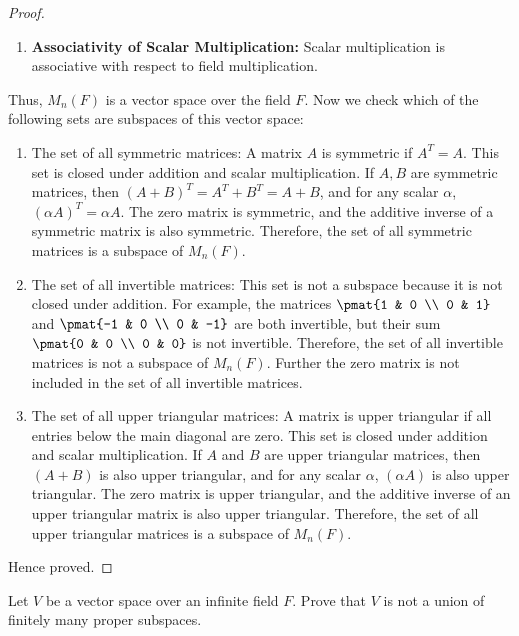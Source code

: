 \documentclass[openany]{book}
\begin{document}
\begin{proof}
\begin{enumerate}
        \item 	\textbf{Associativity of Scalar Multiplication:} Scalar multiplication is associative with respect to field multiplication.
    \end{enumerate}
    Thus, $M_n(F)$ is a vector space over the field $F$.
    Now we check which of the following sets are subspaces of this vector space:
    \begin{enumerate}
        \item The set of all symmetric matrices: A matrix $A$ is symmetric if $A^T = A$. This set is closed under addition and scalar multiplication. If $A, B$ are symmetric matrices, then $(A + B)^T = A^T + B^T = A + B$, and for any scalar $\alpha$, $(\alpha A)^T = \alpha A$. The zero matrix is symmetric, and the additive inverse of a symmetric matrix is also symmetric. Therefore, the set of all symmetric matrices is a subspace of $M_n(F)$.
        \item The set of all invertible matrices: This set is not a subspace because it is not closed under addition. For example, the matrices $\pmat{1 & 0 \\ 0 & 1}$ and $\pmat{-1 & 0 \\ 0 & -1}$ are both invertible, but their sum $\pmat{0 & 0 \\ 0 & 0}$ is not invertible. Therefore, the set of all invertible matrices is not a subspace of $M_n(F)$. Further the zero matrix is not included in the set of all invertible matrices. 
        \item The set of all upper triangular matrices: A matrix is upper triangular if all entries below the main diagonal are zero. This set is closed under addition and scalar multiplication. If $A$ and $B$ are upper triangular matrices, then $(A + B)$ is also upper triangular, and for any scalar $\alpha$, $(\alpha A)$ is also upper triangular. The zero matrix is upper triangular, and the additive inverse of an upper triangular matrix is also upper triangular. Therefore, the set of all upper triangular matrices is a subspace of $M_n(F)$.
    \end{enumerate}
    Hence proved. 
\end{proof}
\begin{exercise}
    Let $V$ be a vector space over an infinite field $F$. Prove that $V$ is not a union of finitely many proper subspaces. 
\end{exercise}
\end{document}
